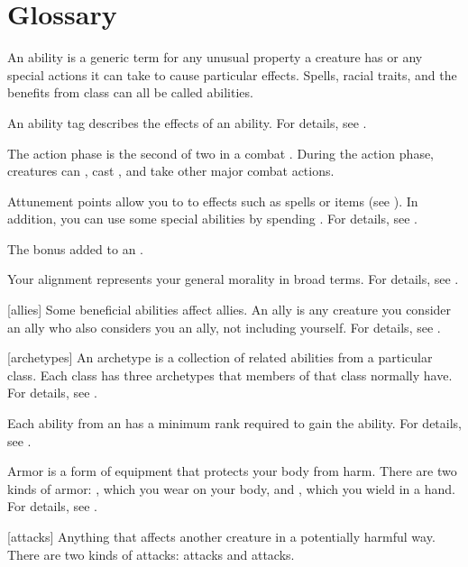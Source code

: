 \chapter{Glossary}\label{Glossary}

 An ability is a generic term for any unusual property a creature has or any special actions it can take to cause particular effects.
Spells, racial traits, and the benefits from class  can all be called abilities.

 An ability tag describes the effects of an ability.
For details, see .

 The action phase is the second of two  in a combat .
During the action phase, creatures can , cast , and take other major combat actions.

 Attunement points allow you to  to effects such as spells or items (see ).
In addition, you can use some special abilities by spending .
For details, see .

 The bonus added to an .

 Your alignment represents your general morality in broad terms.
For details, see .

[allies] Some beneficial abilities affect allies.
An ally is any creature you consider an ally who also considers you an ally, not including yourself.
For details, see .

[archetypes] An archetype is a collection of related abilities from a particular class.
Each class has three archetypes that members of that class normally have.
For details, see .

 Each ability from an  has a minimum rank required to gain the ability.
For details, see .

 Armor is a form of equipment that protects your body from harm.
There are two kinds of armor: , which you wear on your body, and , which you wield in a hand.
For details, see .

[attacks] Anything that affects another creature in a potentially harmful way. There are two kinds of attacks:  attacks and  attacks.

